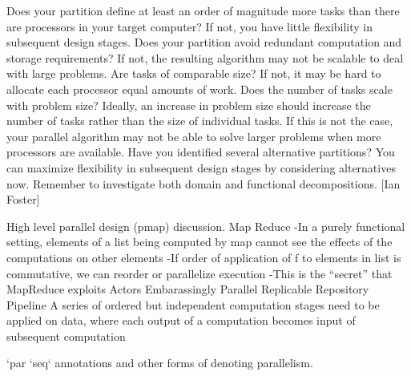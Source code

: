 \documentclass[main.tex]{subfiles}
\begin{document}
Does your partition define at least an order of magnitude more tasks than there are processors in your target computer? If not, you have little flexibility in subsequent design stages.
Does your partition avoid redundant computation and storage requirements? If not, the resulting algorithm may not be scalable to deal with large problems.
Are tasks of comparable size? If not, it may be hard to allocate each processor equal amounts of work.
Does the number of tasks scale with problem size? Ideally, an increase in problem size should increase the number of tasks rather than the size of individual tasks. If this is not the case, your parallel algorithm may not be able to solve larger problems when more processors are available.
Have you identified several alternative partitions? You can maximize flexibility in subsequent design stages by considering alternatives now. Remember to investigate both domain and functional decompositions.
[Ian Foster]

High level parallel design (pmap) discussion.
Map Reduce
-In a purely functional setting, elements of a list being computed by map cannot see the effects of the computations on other elements
-If order of application of f to elements in list is commutative, we can reorder or parallelize execution
-This is the “secret” that MapReduce exploits
Actors
Embarassingly Parallel
Replicable
Repository
Pipeline A series of ordered but independent computation stages need to be applied on data,
where each output of a computation becomes input of subsequent computation

`par `seq` annotations and other forms of denoting parallelism.
\end{document}
